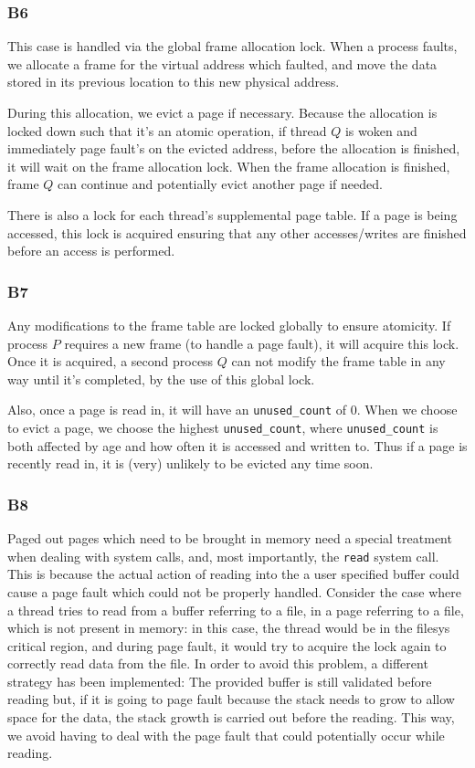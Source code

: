 \documentclass[a4wide, 11pt]{article}
\newcommand{\tx}{\texttt}
\begin{document}
\subsubsection{B6}

This case is handled via the global frame allocation lock. When a process faults, we allocate a frame for the virtual address which faulted, and move the data stored in its previous location to this new physical address.

During this allocation, we evict a page if necessary. Because the allocation is locked down such that it's an atomic operation, if thread $Q$ is woken and immediately page fault's on the evicted address, before the allocation is finished, it will wait on the frame allocation lock. When the frame allocation is finished, frame $Q$ can continue and potentially evict another page if needed.

There is also a lock for each thread's supplemental page table. If a page is being accessed, this lock is acquired ensuring that any other accesses/writes are finished before an access is performed.

\subsubsection{B7}

Any modifications to the frame table are locked globally to ensure atomicity. If process $P$ requires a new frame (to handle a page fault), it will acquire this lock. Once it is acquired, a second process $Q$ can not modify the frame table in any way until it's completed, by the use of this global lock.

Also, once a page is read in, it will have an \tx{unused\_count} of 0. When we choose to evict a page, we choose the highest \tx{unused\_count}, where \tx{unused\_count} is both affected by age and how often it is accessed and written to. Thus if a page is recently read in, it is (very) unlikely to be evicted any time soon.

\subsubsection{B8}
Paged out pages which need to be brought in memory need a special treatment when dealing with system calls, and, most importantly, the \tx{read} system call. This is because the actual action of reading into the a user specified buffer could cause a page fault which could not be properly handled. Consider the case where a thread tries to read from a buffer referring to a file, in a page referring to a file, which is not present in memory: in this case, the thread would be in the filesys critical region, and during page fault, it would try to acquire the lock again to correctly read data from the file. In order to avoid this problem, a different strategy has been implemented: The provided buffer is still validated before reading but, if it is going to page fault because the stack needs to grow to allow space for the data, the stack growth is carried out before the reading. This way, we avoid having to deal with the page fault that could potentially occur while reading.  
\end{document}
